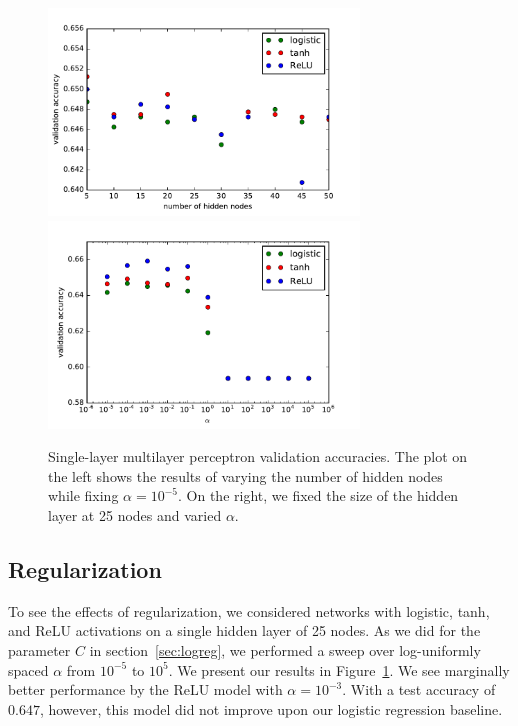 \documentclass{article}
\newcommand\halfwidth{3.25in}
\begin{document}
\begin{multicols}{2}
\begin{figure}[t] %
   \centering
   \includegraphics[width=\halfwidth]{img/mlp-one-hidden-layer.pdf}
   \includegraphics[width=\halfwidth]{img/mlp-alpha-experiment.pdf}
   \caption{Single-layer multilayer perceptron validation accuracies.
   The plot on the left shows the results of varying the number of hidden nodes
   while fixing $\alpha = 10^{-5}$.
   On the right, we fixed the size of the hidden layer at 25 nodes
   and varied $\alpha$.}
   \label{fig:mlp-plots}
\end{figure}


\subsection{Regularization}

To see the effects of regularization,
we considered networks with logistic, tanh, and ReLU activations
on a single hidden layer of 25 nodes.
As we did for the parameter $C$ in section~\ref{sec:logreg},
we performed a sweep over log-uniformly spaced $\alpha$ from $10^{-5}$ to $10^5$.
We present our results in Figure~\ref{fig:mlp-plots}.
We see marginally better performance by the ReLU model with $\alpha=10^{-3}$.
With a test accuracy of $0.647$, however,
this model did not improve upon our logistic regression baseline.



\end{multicols}
\end{document}
